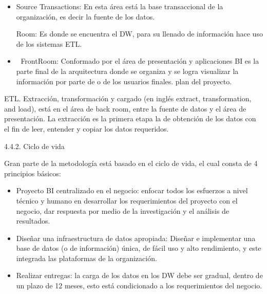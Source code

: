 \documentclass[%
 reprint,
 amsmath,amssymb,
 aps,
]{revtex4-1}
\begin{document}
\begin{itemize}
	\item Source Transactions: En esta área está la base transaccional de la
organización, es decir la fuente de los datos.

	\itemBack Room: Es donde se encuentra el DW, para su llenado de información hace
uso de los sistemas ETL.

	\item FrontRoom: Conformado por el área de presentación y aplicaciones BI es la
parte final de la arquitectura donde se organiza y se logra visualizar la
información por parte de o de los usuarios finales.
 plan del proyecto.
\end{itemize}

ETL.
Extracción, transformación y cargado (en inglés extract, transformation, and load), está
en el área de back room, entre la fuente de datos y el área de presentación. La
extracción es la primera etapa la de obtención de los datos con el fin de leer, entender
y copiar los datos requeridos.  

4.4.2. Ciclo de vida

Gran parte de la metodología está basado en el ciclo de vida, el cual consta de 4
principios básicos:



\begin{itemize}
		\item Proyecto BI centralizado en el negocio: enfocar todos los esfuerzos a nivel
técnico y humano en desarrollar los requerimientos del proyecto con el negocio,
dar respuesta por medio de la investigación y el análisis de resultados.

		\item Diseñar una infraestructura de datos apropiada: Diseñar e implementar una
base de datos (o de información) única, de fácil uso y alto rendimiento, y este
integrada las plataformas de la organización.
		
		\item Realizar entregas: la carga de los datos en los DW debe ser gradual, dentro de
un plazo de 12 meses, esto está condicionado a los requerimientos del negocio.

		

	
\end{itemize}

\end{document}
